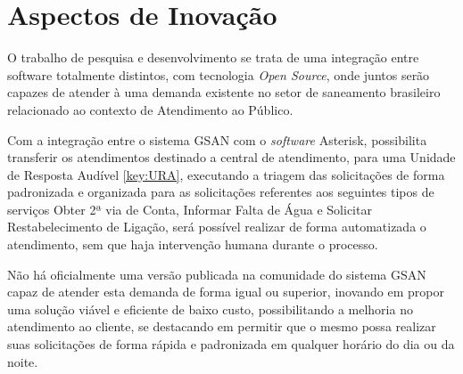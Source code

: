 \section*{Aspectos de Inovação}
O trabalho de pesquisa e desenvolvimento se trata de uma integração entre software totalmente distintos, com tecnologia \textit{Open Source}, onde juntos serão capazes de atender à uma demanda existente no setor de saneamento brasileiro relacionado ao contexto de Atendimento ao Público.

Com a integração entre o sistema GSAN com o \textit{software} Asterisk, possibilita transferir os atendimentos destinado a central de atendimento, para uma Unidade de Resposta Audível \ref{key:URA}, executando a triagem das solicitações de forma padronizada e organizada para as solicitações referentes aos seguintes tipos de serviços Obter 2ª via de Conta, Informar Falta de Água e Solicitar Restabelecimento de Ligação, será possível realizar de forma automatizada o atendimento, sem que haja intervenção humana durante o processo. 

Não há oficialmente uma versão publicada na comunidade do sistema GSAN capaz de atender esta demanda de forma igual ou superior, inovando em propor uma solução viável e eficiente de baixo custo, possibilitando a melhoria no atendimento ao cliente, se destacando em permitir que o mesmo possa realizar suas solicitações de forma rápida e padronizada em qualquer horário do dia ou da noite.